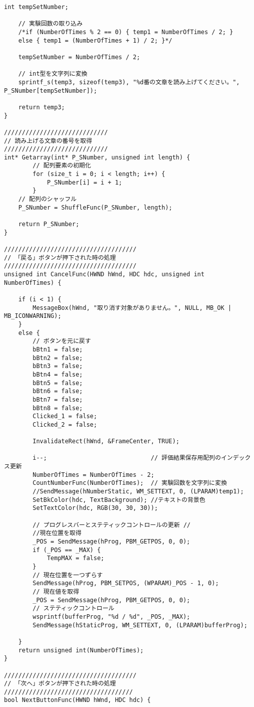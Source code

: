 \begin{lstlisting}[caption=main.cpp]
	int tempSetNumber;
	
	// 実験回数の取り込み
	/*if (NumberOfTimes % 2 == 0) { temp1 = NumberOfTimes / 2; }
	else { temp1 = (NumberOfTimes + 1) / 2; }*/

	tempSetNumber = NumberOfTimes / 2;

	// int型を文字列に変換
	sprintf_s(temp3, sizeof(temp3), "%d番の文章を読み上げてください。", P_SNumber[tempSetNumber]);

	return temp3;
}

/////////////////////////////
// 読み上げる文章の番号を取得
/////////////////////////////
int* Getarray(int* P_SNumber, unsigned int length) {
		// 配列要素の初期化
		for (size_t i = 0; i < length; i++) {
			P_SNumber[i] = i + 1; 
		}
	// 配列のシャッフル
	P_SNumber = ShuffleFunc(P_SNumber, length);

	return P_SNumber;
}

/////////////////////////////////////
// 「戻る」ボタンが押下された時の処理
/////////////////////////////////////
unsigned int CancelFunc(HWND hWnd, HDC hdc, unsigned int NumberOfTimes) {

	if (i < 1) {
		MessageBox(hWnd, "取り消す対象がありません。", NULL, MB_OK | MB_ICONWARNING);
	}
	else {
		// ボタンを元に戻す
		bBtn1 = false;
		bBtn2 = false;
		bBtn3 = false;
		bBtn4 = false;
		bBtn5 = false;
		bBtn6 = false;
		bBtn7 = false;
		bBtn8 = false;
		Clicked_1 = false;
		Clicked_2 = false;

		InvalidateRect(hWnd, &FrameCenter, TRUE);

		i--;                             // 評価結果保存用配列のインデックス更新
		NumberOfTimes = NumberOfTimes - 2;
		CountNumberFunc(NumberOfTimes);  // 実験回数を文字列に変換
		//SendMessage(hNumberStatic, WM_SETTEXT, 0, (LPARAM)temp1);
		SetBkColor(hdc, TextBackground); //テキストの背景色
		SetTextColor(hdc, RGB(30, 30, 30));

		// プログレスバーとステティックコントロールの更新 //
		//現在位置を取得
		_POS = SendMessage(hProg, PBM_GETPOS, 0, 0); 
		if (_POS == _MAX) {
			TempMAX = false;
		}
		// 現在位置を一つずらす
		SendMessage(hProg, PBM_SETPOS, (WPARAM)_POS - 1, 0);
		// 現在値を取得
		_POS = SendMessage(hProg, PBM_GETPOS, 0, 0);
		// ステティックコントロール
		wsprintf(bufferProg, "%d / %d", _POS, _MAX);
		SendMessage(hStaticProg, WM_SETTEXT, 0, (LPARAM)bufferProg);

	}
	return unsigned int(NumberOfTimes);
}

/////////////////////////////////////
// 「次へ」ボタンが押下された時の処理
////////////////////////////////////
bool NextButtonFunc(HWND hWnd, HDC hdc) {


\end{lstlisting}
